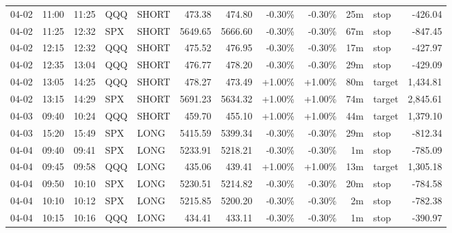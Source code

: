 \documentclass[11pt,a4paper,twoside]{article}
\begin{document}
\begin{center}
\begin{longtable}{>{\color{txtmain}}l l l l l r r r r r >{\color{txtmain}}l r}
04-02 & 11:00 & 11:25 & QQQ & SHORT & 473.38 & 474.80 & \textcolor{lossred}{-0.30\%} & \textcolor{lossred}{-0.30\%} & 25m & stop & \textcolor{lossred}{-426.04} \\
04-02 & 11:25 & 12:32 & SPX & SHORT & 5649.65 & 5666.60 & \textcolor{lossred}{-0.30\%} & \textcolor{lossred}{-0.30\%} & 67m & stop & \textcolor{lossred}{-847.45} \\
04-02 & 12:15 & 12:32 & QQQ & SHORT & 475.52 & 476.95 & \textcolor{lossred}{-0.30\%} & \textcolor{lossred}{-0.30\%} & 17m & stop & \textcolor{lossred}{-427.97} \\
04-02 & 12:35 & 13:04 & QQQ & SHORT & 476.77 & 478.20 & \textcolor{lossred}{-0.30\%} & \textcolor{lossred}{-0.30\%} & 29m & stop & \textcolor{lossred}{-429.09} \\
04-02 & 13:05 & 14:25 & QQQ & SHORT & 478.27 & 473.49 & \textcolor{wingreen}{+1.00\%} & \textcolor{wingreen}{+1.00\%} & 80m & target & \textcolor{wingreen}{1,434.81} \\
04-02 & 13:15 & 14:29 & SPX & SHORT & 5691.23 & 5634.32 & \textcolor{wingreen}{+1.00\%} & \textcolor{wingreen}{+1.00\%} & 74m & target & \textcolor{wingreen}{2,845.61} \\
04-03 & 09:40 & 10:24 & QQQ & SHORT & 459.70 & 455.10 & \textcolor{wingreen}{+1.00\%} & \textcolor{wingreen}{+1.00\%} & 44m & target & \textcolor{wingreen}{1,379.10} \\
04-03 & 15:20 & 15:49 & SPX & LONG & 5415.59 & 5399.34 & \textcolor{lossred}{-0.30\%} & \textcolor{lossred}{-0.30\%} & 29m & stop & \textcolor{lossred}{-812.34} \\
04-04 & 09:40 & 09:41 & SPX & LONG & 5233.91 & 5218.21 & \textcolor{lossred}{-0.30\%} & \textcolor{lossred}{-0.30\%} & 1m & stop & \textcolor{lossred}{-785.09} \\
04-04 & 09:45 & 09:58 & QQQ & LONG & 435.06 & 439.41 & \textcolor{wingreen}{+1.00\%} & \textcolor{wingreen}{+1.00\%} & 13m & target & \textcolor{wingreen}{1,305.18} \\
04-04 & 09:50 & 10:10 & SPX & LONG & 5230.51 & 5214.82 & \textcolor{lossred}{-0.30\%} & \textcolor{lossred}{-0.30\%} & 20m & stop & \textcolor{lossred}{-784.58} \\
04-04 & 10:10 & 10:12 & SPX & LONG & 5215.85 & 5200.20 & \textcolor{lossred}{-0.30\%} & \textcolor{lossred}{-0.30\%} & 2m & stop & \textcolor{lossred}{-782.38} \\
04-04 & 10:15 & 10:16 & QQQ & LONG & 434.41 & 433.11 & \textcolor{lossred}{-0.30\%} & \textcolor{lossred}{-0.30\%} & 1m & stop & \textcolor{lossred}{-390.97} \\

\end{longtable}
\end{center}
\end{document}
